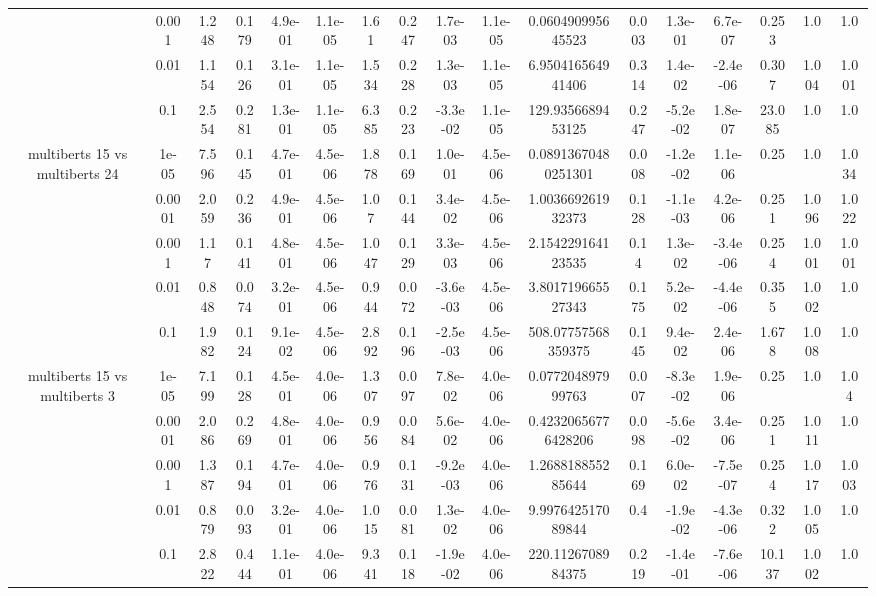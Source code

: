 \begin{tabular}{|c|c|c|c|c|c|c|c|c|c|c|c|c|c|c|c|c|}
 & 0.001 & 1.248 & 0.179 & 4.9e-01 & 1.1e-05 & 1.61 & 0.247 & 1.7e-03 & 1.1e-05 & 0.060490995645523 & 0.003 & 1.3e-01 & 6.7e-07 & 0.253 & 1.0 & 1.0 \\
 & 0.01 & 1.154 & 0.126 & 3.1e-01 & 1.1e-05 & 1.534 & 0.228 & 1.3e-03 & 1.1e-05 & 6.950416564941406 & 0.314 & 1.4e-02 & -2.4e-06 & 0.307 & 1.004 & 1.001 \\
 & 0.1 & 2.554 & 0.281 & 1.3e-01 & 1.1e-05 & 6.385 & 0.223 & -3.3e-02 & 1.1e-05 & 129.9356689453125 & 0.247 & -5.2e-02 & 1.8e-07 & 23.085 & 1.0 & 1.0 \\
\hline
\multirow{5}{*}{multiberts 15 vs multiberts 24} & 1e-05 & 7.596 & 0.145 & 4.7e-01 & 4.5e-06 & 1.878 & 0.169 & 1.0e-01 & 4.5e-06 & 0.08913670480251301 & 0.008 & -1.2e-02 & 1.1e-06 & 0.25 & 1.0 & 1.034 \\
 & 0.0001 & 2.059 & 0.236 & 4.9e-01 & 4.5e-06 & 1.07 & 0.144 & 3.4e-02 & 4.5e-06 & 1.003669261932373 & 0.128 & -1.1e-03 & 4.2e-06 & 0.251 & 1.096 & 1.022 \\
 & 0.001 & 1.17 & 0.141 & 4.8e-01 & 4.5e-06 & 1.047 & 0.129 & 3.3e-03 & 4.5e-06 & 2.154229164123535 & 0.14 & 1.3e-02 & -3.4e-06 & 0.254 & 1.001 & 1.001 \\
 & 0.01 & 0.848 & 0.074 & 3.2e-01 & 4.5e-06 & 0.944 & 0.072 & -3.6e-03 & 4.5e-06 & 3.801719665527343 & 0.175 & 5.2e-02 & -4.4e-06 & 0.355 & 1.002 & 1.0 \\
 & 0.1 & 1.982 & 0.124 & 9.1e-02 & 4.5e-06 & 2.892 & 0.196 & -2.5e-03 & 4.5e-06 & 508.07757568359375 & 0.145 & 9.4e-02 & 2.4e-06 & 1.678 & 1.008 & 1.0 \\
\hline
\multirow{5}{*}{multiberts 15 vs multiberts 3} & 1e-05 & 7.199 & 0.128 & 4.5e-01 & 4.0e-06 & 1.307 & 0.097 & 7.8e-02 & 4.0e-06 & 0.077204897999763 & 0.007 & -8.3e-02 & 1.9e-06 & 0.25 & 1.0 & 1.04 \\
 & 0.0001 & 2.086 & 0.269 & 4.8e-01 & 4.0e-06 & 0.956 & 0.084 & 5.6e-02 & 4.0e-06 & 0.42320656776428206 & 0.098 & -5.6e-02 & 3.4e-06 & 0.251 & 1.011 & 1.0 \\
 & 0.001 & 1.387 & 0.194 & 4.7e-01 & 4.0e-06 & 0.976 & 0.131 & -9.2e-03 & 4.0e-06 & 1.268818855285644 & 0.169 & 6.0e-02 & -7.5e-07 & 0.254 & 1.017 & 1.003 \\
 & 0.01 & 0.879 & 0.093 & 3.2e-01 & 4.0e-06 & 1.015 & 0.081 & 1.3e-02 & 4.0e-06 & 9.997642517089844 & 0.4 & -1.9e-02 & -4.3e-06 & 0.322 & 1.005 & 1.0 \\
 & 0.1 & 2.822 & 0.444 & 1.1e-01 & 4.0e-06 & 9.341 & 0.118 & -1.9e-02 & 4.0e-06 & 220.1126708984375 & 0.219 & -1.4e-01 & -7.6e-06 & 10.137 & 1.002 & 1.0 \\

\end{tabular}
